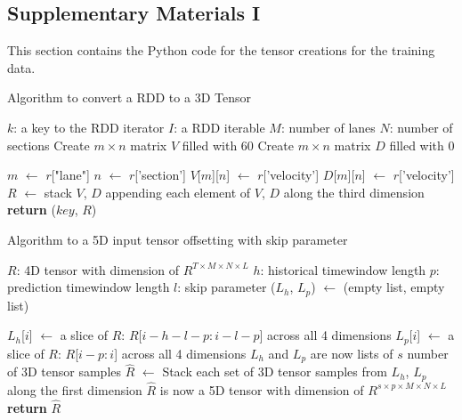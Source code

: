\documentclass[11pt]{uonthesis}
\begin{document}
\begin{appendices}

\chapter{Supplementary Materials I}

This section contains the Python code for the tensor creations for the training data.

\begin{algorithm}
    \caption{Algorithm to convert a RDD to a 3D Tensor}
    \label{alg:rddto3d}
    \begin{algorithmic}[1]
    \State $k$: a key to the RDD iterator
    \State $I$: a RDD iterable
    \State $M$: number of lanes
    \State $N$: number of sections
        \State Create $m \times n$ matrix $V$ filled with 60 
        \State Create $m \times n$ matrix $D$ filled with 0
    
            \State $m$ $\gets$ $r$["lane"]
            \State $n$ $\gets$ $r$['section']
            \State $V$[$m$][$n$] $\gets$ $r$['velocity']
            \State $D$[$m$][$n$] $\gets$ $r$['velocity']
        \EndFor
        \State $R$ $\gets$ stack $V$, $D$ appending each element of $V$, $D$ along the third dimension
        \State \textbf{return} ($key$, $R$)
        \EndProcedure
    \end{algorithmic}
\end{algorithm}

\begin{algorithm}
    \caption{Algorithm to a 5D input tensor offsetting with skip parameter}
    \label{alg:offset4d}
    \begin{algorithmic}[1]
    \State $R$: 4D tensor with dimension of $R^{T{\times}M{\times}N{\times}L}$
    \State $h$: historical timewindow length
    \State $p$: prediction timewindow length
    \State $l$: skip parameter
        \State ($L_h$, $L_p$) $\gets$ (empty list, empty list) 
    
            \State $L_h$[$i$] $\gets$ a slice of $R$: $R$[$i-h-l-p:i-l-p$] across all 4 dimensions
            \State $L_p$[$i$] $\gets$ a slice of $R$: $R$[$i-p:i$] across all 4 dimensions
        \EndFor \Comment $L_h$ and $L_p$ are now lists of $s$ number of 3D tensor samples
        \State $\hat{R}$ $\gets$ Stack each set of 3D tensor samples from $L_h$, $L_p$ along the first dimension \Comment $\hat{R}$ is now a 5D tensor with dimension of $R^{s{\times}p{\times}M{\times}N{\times}L}$
        \State \textbf{return} $\hat{R}$
        \EndProcedure
    \end{algorithmic}
\end{algorithm}
    


\end{appendices}
\end{document}
